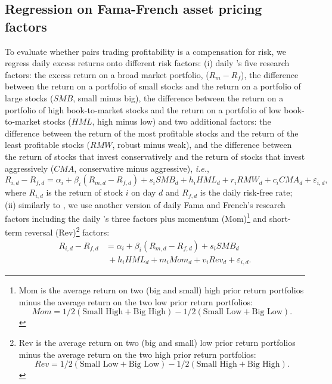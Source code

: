 \documentclass[a4paper]{article}
\begin{document}
	\medskip
	
	\subsection{Regression on Fama-French asset pricing factors}
	
	To evaluate whether pairs trading profitability is a compensation for risk, we regress daily excess returns onto different risk factors: (i) daily \citet*{ff15}'s five research factors: the excess return on a broad market portfolio, ($R_{m} - R_{f}$), the difference between the return on a portfolio of small stocks and the return on a portfolio of large stocks ($SMB$, small minus big), the difference between the return on a portfolio of high book-to-market stocks and the return on a portfolio of low book-to-market stocks ($HML$, high minus low) and two additional factors: the difference between the return of the most profitable stocks and the return of the least profitable stocks ($RMW$, robust minus weak), and the difference between the return of stocks that invest conservatively and the return of stocks that invest aggressively ($CMA$, conservative minus aggressive),  \emph{i.e.},
	\begin{equation}
	R_{i,d}-R_{f,d}=\alpha _{i}+\beta _{i}\left( R_{m,d}-R_{f,d}\right)
	+s_{i}SMB_{d}+h_{i}HML_{d}+r_{i}RMW_{d}+c_{i}CMA_{d}+\varepsilon _{i,d},
	\label{eq:eq101}
	\end{equation}
	where $R_{i,d}$ is the return of stock $i$ on day $d$ and $R_{f,d}$ is the daily risk-free rate; (ii) similarly to \citet*{ggr06}, we use another version of daily Fama and French's research factors including the daily \citet*{ff93}'s three factors plus momentum (Mom)\footnote{Mom is the average return on two (big and small) high prior return portfolios minus the average return on the two low prior return portfolios:
		\begin{equation*}
		Mom = 1/2 (\text{Small High} + \text{Big High}) - 1/2(\text{Small Low} + \text{Big Low}).
		\end{equation*}}
	and short-term reversal (Rev)\footnote{Rev is the average return on two (big and small) low prior return portfolios minus the average return on the two high prior return portfolios:
		\begin{equation*}
		Rev = 1/2(\text{Small Low} + \text{Big Low})- 1/2(\text{Small High} + \text{Big High}).
		\end{equation*}}
	factors:
	\begin{equation}
	\begin{aligned}
	R_{i,d}-R_{f,d}&=\alpha _{i}+\beta _{i}\left( R_{m,d}-R_{f,d}\right)+s_{i}SMB_{d}\\
	&~+h_{i}HML_{d}+m_{i}Mom_{d}+v_{i}Rev_{d}+\varepsilon _{i,d}.
	\end{aligned}
	\label{eq:eq104}
	\end{equation}
	
\end{document}
